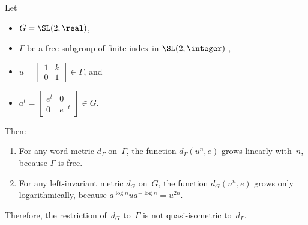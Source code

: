 \begin{eg}
Let 
\noprelistbreak
	\begin{itemize}
	\item $G = \SL(2,\real)$,
	\item $\Gamma$ be a free subgroup of finite index in $\SL(2,\integer)$ , 
	\item $u = \begin{bmatrix} 1 & k \\ 0 & 1 \end{bmatrix} \in \Gamma$,
	and
	\item $a^t =  \begin{bmatrix} e^t & 0 \\ 0 & e^{-t} \end{bmatrix} \in G$.
	\end{itemize}
Then:
	\begin{enumerate}
	\item For any word metric $d_\Gamma$ on~$\Gamma$, the function $d_\Gamma(u^n, e)$ grows linearly with~$n$, because $\Gamma$ is free.
	\item For any left-invariant metric $d_G$ on~$G$, the function $d_G(u^n, e)$ grows only logarithmically, because $a^{\log n} u a^{-\log n} = u^{2n}$.
	\end{enumerate}
Therefore, the restriction of~$d_G$ to~$\Gamma$ is not quasi-isometric to~$d_\Gamma$.
\end{eg}


